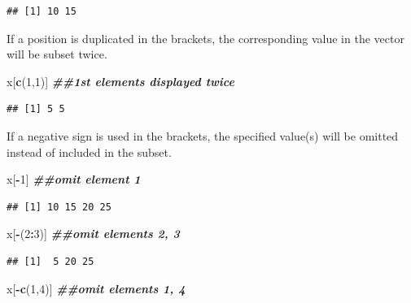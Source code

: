 \documentclass[
]{book}
\newenvironment{Shaded}{\begin{snugshade}}{\end{snugshade}}
\newcommand{\DecValTok}[1]{\textcolor[rgb]{0.00,0.00,0.81}{#1}}
\newcommand{\DocumentationTok}[1]{\textcolor[rgb]{0.56,0.35,0.01}{\textbf{\textit{#1}}}}
\newcommand{\FunctionTok}[1]{\textcolor[rgb]{0.13,0.29,0.53}{\textbf{#1}}}
\newcommand{\NormalTok}[1]{#1}
\newcommand{\SpecialCharTok}[1]{\textcolor[rgb]{0.81,0.36,0.00}{\textbf{#1}}}
\theoremstyle{definition}
\theoremstyle{definition}
\theoremstyle{definition}
\theoremstyle{definition}
\theoremstyle{remark}
\begin{document}
\begin{verbatim}
## [1] 10 15
\end{verbatim}

If a position is duplicated in the brackets, the corresponding value in the vector will be subset twice.

\begin{Shaded}
\begin{Highlighting}[]
\NormalTok{x[}\FunctionTok{c}\NormalTok{(}\DecValTok{1}\NormalTok{,}\DecValTok{1}\NormalTok{)] }\DocumentationTok{\#\#1st elements displayed twice}
\end{Highlighting}
\end{Shaded}

\begin{verbatim}
## [1] 5 5
\end{verbatim}

If a negative sign is used in the brackets, the specified value(s) will be omitted instead of included in the subset.

\begin{Shaded}
\begin{Highlighting}[]
\NormalTok{x[}\SpecialCharTok{{-}}\DecValTok{1}\NormalTok{] }\DocumentationTok{\#\#omit element 1}
\end{Highlighting}
\end{Shaded}

\begin{verbatim}
## [1] 10 15 20 25
\end{verbatim}

\begin{Shaded}
\begin{Highlighting}[]
\NormalTok{x[}\SpecialCharTok{{-}}\NormalTok{(}\DecValTok{2}\SpecialCharTok{:}\DecValTok{3}\NormalTok{)] }\DocumentationTok{\#\#omit elements 2, 3}
\end{Highlighting}
\end{Shaded}

\begin{verbatim}
## [1]  5 20 25
\end{verbatim}

\begin{Shaded}
\begin{Highlighting}[]
\NormalTok{x[}\SpecialCharTok{{-}}\FunctionTok{c}\NormalTok{(}\DecValTok{1}\NormalTok{,}\DecValTok{4}\NormalTok{)] }\DocumentationTok{\#\#omit elements 1, 4}
\end{Highlighting}
\end{Shaded}
\end{document}
